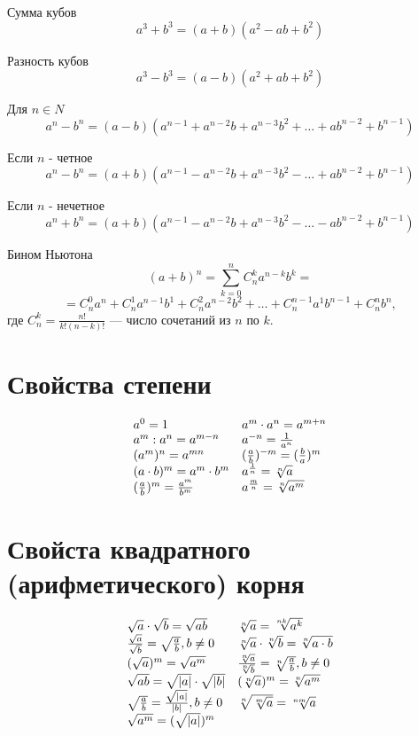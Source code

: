 \documentclass[a5paper, 8pt]{extarticle}
\begin{document}
Сумма кубов
$$a^3+b^3=(a+b)(a^2-ab+b^2)$$

Разность кубов
$$a^3-b^3=(a-b)(a^2+ab+b^2)$$

Для $n\in N$
$$a^n-b^n=(a-b)(a^{n-1}+a^{n-2}b+a^{n-3}b^2+\dots +ab^{n-2}+b^{n-1})$$

Если $n$ - четное
$$a^n-b^n=(a+b)(a^{n-1}-a^{n-2}b+a^{n-3}b^2-\dots +ab^{n-2}+b^{n-1})$$

Если $n$ - нечетное
$$a^n+b^n=(a+b)(a^{n-1}-a^{n-2}b+a^{n-3}b^2-\dots -ab^{n-2}+b^{n-1})$$

Бином Ньютона
$$(a+b)^n=\sum\limits_{k=0}^n C_n^ka^{n-k}b^k=$$
$$=C_n^0a^n+C_n^1a^{n-1}b^1+C_n^2a^{n-2}b^2+\dots +C_n^{n-1}a^1b^{n-1}+C_n^nb^n,$$
где $C_n^k=\frac{n!}{k!(n-k)!}$ --- число сочетаний из $n$ по $k.$

\section{Свойства степени}

$$
\begin{array}{ll}
a^0=1  & a^m\cdot a^n=a^{m+n}\\
a^m: a^n=a^{m-n} & a^{-n}=\frac{1}{a^n}\\
(a^m)^n=a^{mn} & (\frac{a}{b})^{-m}=(\frac{b}{a})^{m}\\
(a\cdot b)^m=a^m\cdot b^m & a^{\frac{1}{n}}=\root{n}\of{a}\\
(\frac{a}{b})^m =\frac{a^m}{b^m} & a^{\frac{m}{n}}=\root{n}\of{a^m}\\
\end{array}
$$

\section{Свойста квадратного (арифметического) корня}

$$
\begin{array}{ll}
\sqrt{a}\cdot \sqrt{b} = \sqrt{ab}  & \root{n}\of{a}=\root{nk}\of{a^k} \\
\frac{\sqrt{a}}{\sqrt{b}}=\sqrt{\frac{a}{b}}, b\not= 0 & \root{n}\of{a}\cdot \root{n}\of{b}=\root{n}\of{a\cdot b}\\
(\sqrt{a})^m=\sqrt{a^m} & \frac{\root{n}\of{a}}{\root{n}\of{b}}=\root{n}\of{\frac{a}{b}}, b\not=0\\
\sqrt{ab}=\sqrt{|a|}\cdot \sqrt{|b|} & (\root{n}\of{a})^m = \root{n}\of{a^m}\\
\sqrt{\frac{a}{b}}=\frac{\sqrt{|a|}}{|b|}, b\not=0 & \root{n}\of{\root{m}\of{a}} = \root{nm}\of{a}\\
\sqrt{a^m}=(\sqrt{|a|})^m
\end{array}
$$
\end{document}
